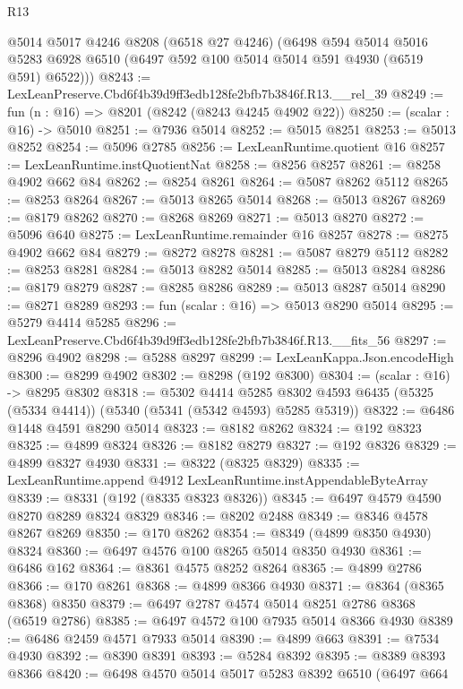 \begin{lexlean}{R13}
\begin{coremodule}
      @5014
      @5017
      @4246
      @8208
      (@6518 @27 @4246)
      (@6498
        @594
        @5014
        @5016
        @5283
        @6928
        @6510
        (@6497 @592 @100 @5014 @5014 @591 @4930 (@6519 @591) @6522)))
@8243 := LexLeanPreserve.Cbd6f4b39d9ff3edb128fe2bfb7b3846f.R13.__rel_39
@8249 := fun (n : @16) => @8201 (@8242 (@8243 @4245 @4902 @22))
@8250 := (scalar : @16) -> @5010
@8251 := @7936 @5014
@8252 := @5015 @8251
@8253 := @5013 @8252
@8254 := @5096 @2785
@8256 := LexLeanRuntime.quotient @16
@8257 := LexLeanRuntime.instQuotientNat
@8258 := @8256 @8257
@8261 := @8258 @4902 @662 @84
@8262 := @8254 @8261
@8264 := @5087 @8262 @5112
@8265 := @8253 @8264
@8267 := @5013 @8265 @5014
@8268 := @5013 @8267
@8269 := @8179 @8262
@8270 := @8268 @8269
@8271 := @5013 @8270
@8272 := @5096 @640
@8275 := LexLeanRuntime.remainder @16 @8257
@8278 := @8275 @4902 @662 @84
@8279 := @8272 @8278
@8281 := @5087 @8279 @5112
@8282 := @8253 @8281
@8284 := @5013 @8282 @5014
@8285 := @5013 @8284
@8286 := @8179 @8279
@8287 := @8285 @8286
@8289 := @5013 @8287 @5014
@8290 := @8271 @8289
@8293 := fun (scalar : @16) => @5013 @8290 @5014
@8295 := @5279 @4414 @5285
@8296 := LexLeanPreserve.Cbd6f4b39d9ff3edb128fe2bfb7b3846f.R13.__fits_56
@8297 := @8296 @4902
@8298 := @5288 @8297
@8299 := LexLeanKappa.Json.encodeHigh
@8300 := @8299 @4902
@8302 := @8298 (@192 @8300)
@8304 := (scalar : @16) -> @8295 @8302
@8318 := @5302
    @4414
    @5285
    @8302
    @4593
    @6435
    (@5325 (@5334 @4414))
    (@5340 (@5341 (@5342 @4593) @5285 @5319))
@8322 := @6486 @1448 @4591 @8290 @5014
@8323 := @8182 @8262
@8324 := @192 @8323
@8325 := @4899 @8324
@8326 := @8182 @8279
@8327 := @192 @8326
@8329 := @4899 @8327 @4930
@8331 := @8322 (@8325 @8329)
@8335 := LexLeanRuntime.append @4912 LexLeanRuntime.instAppendableByteArray
@8339 := @8331 (@192 (@8335 @8323 @8326))
@8345 := @6497 @4579 @4590 @8270 @8289 @8324 @8329
@8346 := @8202 @2488
@8349 := @8346 @4578 @8267 @8269
@8350 := @170 @8262
@8354 := @8349 (@4899 @8350 @4930) @8324
@8360 := @6497 @4576 @100 @8265 @5014 @8350 @4930
@8361 := @6486 @162
@8364 := @8361 @4575 @8252 @8264
@8365 := @4899 @2786
@8366 := @170 @8261
@8368 := @4899 @8366 @4930
@8371 := @8364 (@8365 @8368) @8350
@8379 := @6497 @2787 @4574 @5014 @8251 @2786 @8368 (@6519 @2786)
@8385 := @6497 @4572 @100 @7935 @5014 @8366 @4930
@8389 := @6486 @2459 @4571 @7933 @5014
@8390 := @4899 @663
@8391 := @7534 @4930
@8392 := @8390 @8391
@8393 := @5284 @8392
@8395 := @8389 @8393 @8366
@8420 := @6498
    @4570
    @5014
    @5017
    @5283
    @8392
    @6510
    (@6497
      @664

\end{coremodule}
\end{lexlean}
